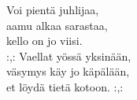 
Voi pientä juhlijaa, \\ aamu alkaa sarastaa, \\ kello on jo viisi. \\ :,: Vaellat yössä yksinään, \\ väsymys käy jo käpälään, \\ et löydä tietä kotoon. :,: